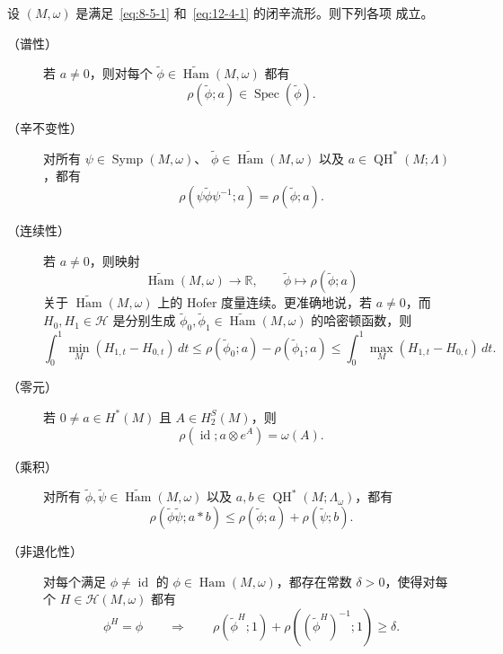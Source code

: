 \begin{theorem}[Oh]\label{thm:12-4-4}
设 $(M,\omega)$ 是满足~\eqref{eq:8-5-1} 和~\eqref{eq:12-4-1} 的闭辛流形。则下列各项
成立。

\begin{description}
\item[（谱性）] 若 $a\ne0$，则对每个
$\widetilde\phi\in\widetilde{\operatorname{Ham}}(M,\omega)$ 都有
\[
  \rho(\widetilde\phi;a)\in\operatorname{Spec}(\widetilde\phi).
\]

\item[（辛不变性）] 对所有 $\psi\in\operatorname{Symp}(M,\omega)$、
$\widetilde\phi\in\widetilde{\operatorname{Ham}}(M,\omega)$ 以及
$a\in\operatorname{QH}^*(M;\Lambda)$，都有
\[
  \rho(\psi\widetilde\phi\psi^{-1};a)=\rho(\widetilde\phi;a).
\]

\item[（连续性）] 若 $a\ne0$，则映射
\[
  \widetilde{\operatorname{Ham}}(M,\omega)\longrightarrow\mathbb R,
  \qquad \widetilde\phi\longmapsto\rho(\widetilde\phi;a)
\]
关于 $\widetilde{\operatorname{Ham}}(M,\omega)$ 上的 Hofer 度量连续。更准确地说，若
$a\ne0$，而 $H_0,H_1\in\mathcal H$ 是分别生成
$\widetilde\phi_0,\widetilde\phi_1\in
\widetilde{\operatorname{Ham}}(M,\omega)$ 的哈密顿函数，则
\begin{equation}\label{eq:12-4-5}
  \int_0^1\min_M(H_{1,t}-H_{0,t})\,dt
  \le\rho(\widetilde\phi_0;a)-\rho(\widetilde\phi_1;a)
  \le\int_0^1\max_M(H_{1,t}-H_{0,t})\,dt.
\end{equation}

\item[（零元）] 若 $0\ne a\in H^*(M)$ 且 $A\in H_2^S(M)$，则
\[
  \rho(\operatorname{id};a\otimes e^A)=\omega(A).
\]

\item[（乘积）] 对所有
$\widetilde\phi,\widetilde\psi\in\widetilde{\operatorname{Ham}}(M,\omega)$ 以及
$a,b\in\operatorname{QH}^*(M;\Lambda_\omega)$，都有
\[
  \rho(\widetilde\phi\widetilde\psi;a*b)
  \le\rho(\widetilde\phi;a)+\rho(\widetilde\psi;b).
\]

\item[（非退化性）] 对每个满足 $\phi\ne\operatorname{id}$ 的
$\phi\in\operatorname{Ham}(M,\omega)$，都存在常数 $\delta>0$，使得对每个
$H\in\mathcal H(M,\omega)$ 都有
\[
  \phi^H=\phi\qquad\Longrightarrow\qquad
  \rho(\widetilde\phi^H;1)+\rho((\widetilde\phi^H)^{-1};1)\ge\delta.
\]
\end{description}
\end{theorem}


